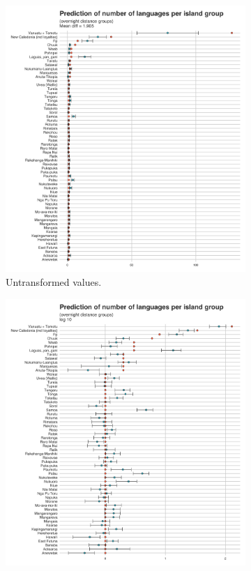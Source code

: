 \documentclass[a4paper,10pt]{article} %
\begin{document}
    \begin{figure}
\centering
    \begin{subfigure}{12cm}
\centering
\includegraphics[width=\textwidth]{illustrations/plots_from_R/Marck_group_model_prediction.png}
\caption{Untransformed values.}
    \end{subfigure}
\hfil
    \begin{subfigure}{12cm}
\centering
\includegraphics[width=\textwidth]{illustrations/plots_from_R/Marck_group_model_prediction_log10.png}

\end{subfigure}
\end{figure}
\end{document}
